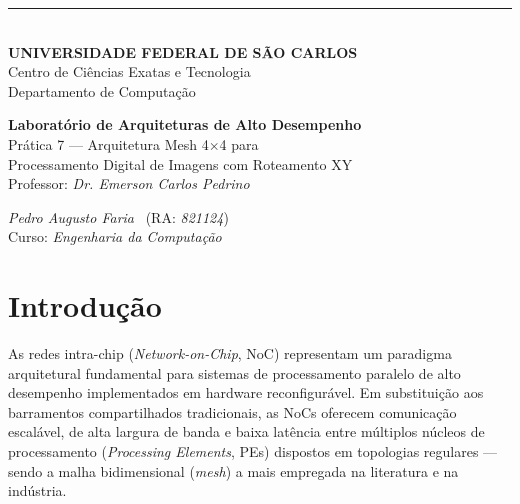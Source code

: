 \documentclass[12pt, a4paper]{article}
\begin{document}
	
	\thispagestyle{empty}
	
	\begin{titlepage}
		\centering
		
		\noindent\rule{\textwidth}{0.8pt}\\[0.2cm]
		{\large \textbf{UNIVERSIDADE FEDERAL DE SÃO CARLOS}}\\[0.15cm]
		{\normalsize Centro de Ciências Exatas e Tecnologia}\\[0.15cm]
		{\normalsize Departamento de Computação}\\[0.15cm]
		
		\vspace{0pt plus 0.35fill}
		
		{\large \textbf{Laboratório de Arquiteturas de Alto Desempenho}}\\[0.4cm]
		{\large Prática 7 --- Arquitetura Mesh 4$\times$4 para\\[0.2cm]
			Processamento Digital de Imagens com Roteamento XY}\\[1.0cm]
		{\normalsize Professor: \textit{Dr. Emerson Carlos Pedrino}}\\
		
		\vspace{0pt plus 0.65fill}
		
		\begin{center}
			{\normalsize \textit{Pedro Augusto Faria} \ (RA: \textit{821124})}\\[0.15cm]
			{\normalsize Curso: \textit{Engenharia da Computação}}\\[0.15cm]
		\end{center}
		
	\end{titlepage}
	
	\setcounter{page}{1}
	
	\section{Introdução}
	
	As redes intra-chip (\textit{Network-on-Chip}, NoC) representam um paradigma
	arquitetural fundamental para sistemas de processamento paralelo de alto
	desempenho implementados em hardware reconfigurável. Em substituição aos
	barramentos compartilhados tradicionais, as NoCs oferecem comunicação
	escalável, de alta largura de banda e baixa latência entre múltiplos núcleos
	de processamento (\textit{Processing Elements}, PEs) dispostos em topologias
	regulares --- sendo a malha bidimensional (\textit{mesh}) a mais empregada
	na literatura e na indústria.
	
\end{document}
